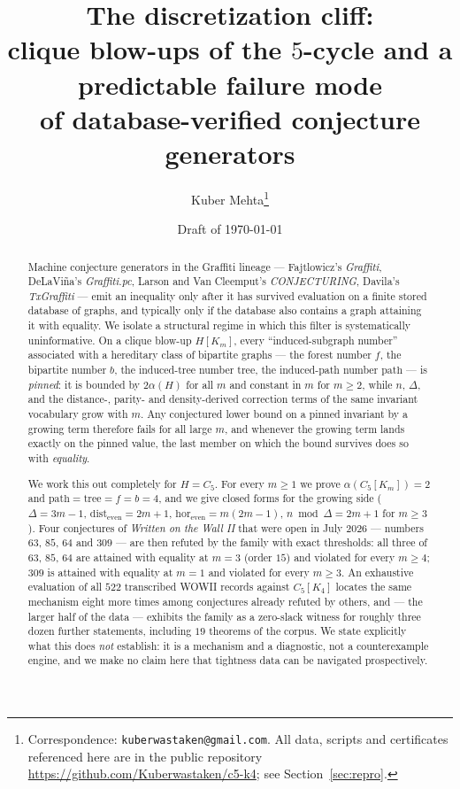 \documentclass[10pt,a4paper]{article}
\title{The discretization cliff:\\
clique blow-ups of the $5$-cycle and a predictable failure mode\\
of database-verified conjecture generators}
\author{Kuber Mehta\thanks{Correspondence: \texttt{kuberwastaken@gmail.com}. All data, scripts and
certificates referenced here are in the public repository
\url{https://github.com/Kuberwastaken/c5-k4}; see Section~\ref{sec:repro}.}}
\date{Draft of \today}
\theoremstyle{plain}
\theoremstyle{definition}
\newcommand{\ind}{\alpha}
\newcommand{\forestnum}{f}
\newcommand{\bipnum}{b}
\newcommand{\treenum}{\mathrm{tree}}
\newcommand{\pathnum}{\mathrm{path}}
\newcommand{\de}{\mathrm{dist_{even}}}
\newcommand{\eh}{\mathrm{hor_{even}}}
\newcommand{\blow}[2]{#1[K_{#2}]}
\begin{document}
\maketitle

\begin{abstract}
Machine conjecture generators in the Graffiti lineage --- Fajtlowicz's \emph{Graffiti},
DeLaVi\~na's \emph{Graffiti.pc}, Larson and Van Cleemput's \emph{CONJECTURING}, Davila's
\emph{TxGraffiti} --- emit an inequality only after it has survived evaluation on a finite
stored database of graphs, and typically only if the database also contains a graph attaining
it with equality. We isolate a structural regime in which this filter is systematically
uninformative. On a clique blow-up $H[K_m]$, every ``induced-subgraph number'' associated with
a hereditary class of bipartite graphs --- the forest number $\forestnum$, the bipartite number
$\bipnum$, the induced-tree number $\treenum$, the induced-path number $\pathnum$ --- is
\emph{pinned}: it is bounded by $2\ind(H)$ for all $m$ and constant in $m$ for $m \ge 2$, while
$n$, $\Delta$, and the distance-, parity- and density-derived correction terms of the same
invariant vocabulary grow with $m$. Any conjectured lower bound on a pinned invariant by a
growing term therefore fails for all large $m$, and whenever the growing term lands exactly on
the pinned value, the last member on which the bound survives does so with \emph{equality}.

We work this out completely for $H = C_5$. For every $m \ge 1$ we prove
$\ind(\blow{C_5}{m}) = 2$ and $\pathnum = \treenum = \forestnum = \bipnum = 4$, and we give
closed forms for the growing side ($\Delta = 3m-1$, $\de = 2m+1$, $\eh = m(2m-1)$,
$n \bmod \Delta = 2m+1$ for $m \ge 3$). Four conjectures of \emph{Written on the Wall II} that
were open in July 2026 --- numbers $63$, $85$, $64$ and $309$ --- are then refuted by the family
with exact thresholds: all three of $63$, $85$, $64$ are attained with equality at $m = 3$
(order $15$) and violated for every $m \ge 4$; $309$ is attained with equality at $m = 1$ and
violated for every $m \ge 3$. An exhaustive evaluation of all $522$ transcribed WOWII records
against $\blow{C_5}{4}$ locates the same mechanism eight more times among conjectures already
refuted by others, and --- the larger half of the data --- exhibits the family as a zero-slack
witness for roughly three dozen further statements, including $19$ theorems of the corpus.
We state explicitly what this does \emph{not} establish: it is a mechanism and a diagnostic,
not a counterexample engine, and we make no claim here that tightness data can be navigated
prospectively.
\end{abstract}
\end{document}
